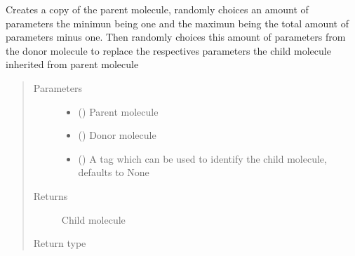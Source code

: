\documentclass[letterpaper,10pt,english]{sphinxmanual}
\begin{document}
\begin{fulllineitems}
\label{\detokenize{MolOpt.molecular:MolOpt.molecular.molecular.crossover_n}}
\sphinxAtStartPar
Creates a copy of the parent molecule, randomly choices an amount of parameters the minimun being one and the 
maximun being the total amount of parameters minus one. Then randomly choices this amount of parameters from the 
donor molecule to replace the respectives parameters the child molecule inherited from parent molecule
\begin{quote}\begin{description}
\item[{Parameters}] \leavevmode\begin{itemize}
\item {} 
\sphinxAtStartPar
{} ({\hyperref[\detokenize{MolOpt.molecular:MolOpt.molecular.molecular.Molecule}]{}}) \textendash{} Parent molecule

\item {} 
\sphinxAtStartPar
{} ({\hyperref[\detokenize{MolOpt.molecular:MolOpt.molecular.molecular.Molecule}]{}}) \textendash{} Donor molecule

\item {} 
\sphinxAtStartPar
{} (\sphinxstyleliteralemphasis{\sphinxupquote{, }}) \textendash{} A tag which can be used to identify the child molecule, defaults to None

\end{itemize}

\item[{Returns}] \leavevmode
\sphinxAtStartPar
Child molecule

\item[{Return type}] \leavevmode
\sphinxAtStartPar
{\hyperref[\detokenize{MolOpt.molecular:MolOpt.molecular.molecular.Molecule}]{}}

\end{description}\end{quote}

\end{fulllineitems}
\end{document}
